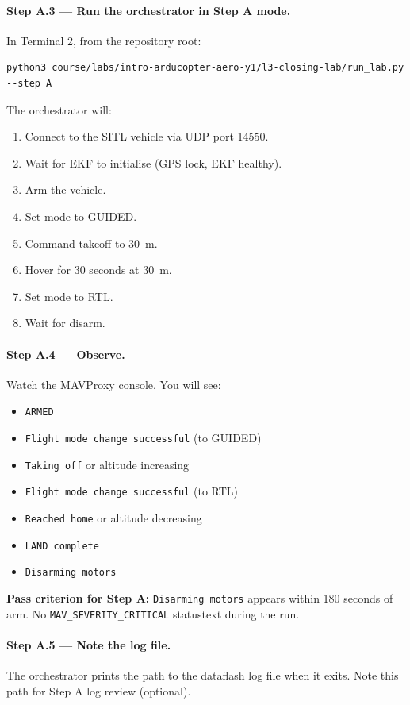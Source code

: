 \documentclass[a4paper,11pt,twoside]{article}
\begin{document}
\paragraph{Step A.3 --- Run the orchestrator in Step A mode.}
In Terminal 2, from the repository root:

\begin{Verbatim}[frame=single,fontsize=\small]
python3 course/labs/intro-arducopter-aero-y1/l3-closing-lab/run_lab.py --step A
\end{Verbatim}

The orchestrator will:
\begin{enumerate}
  \item Connect to the SITL vehicle via UDP port 14550.
  \item Wait for EKF to initialise (GPS lock, EKF healthy).
  \item Arm the vehicle.
  \item Set mode to GUIDED.
  \item Command takeoff to 30~m.
  \item Hover for 30 seconds at 30~m.
  \item Set mode to RTL.
  \item Wait for disarm.
\end{enumerate}

\paragraph{Step A.4 --- Observe.}
Watch the MAVProxy console. You will see:
\begin{itemize}
  \item \texttt{ARMED}
  \item \texttt{Flight mode change successful} (to GUIDED)
  \item \texttt{Taking off} or altitude increasing
  \item \texttt{Flight mode change successful} (to RTL)
  \item \texttt{Reached home} or altitude decreasing
  \item \texttt{LAND complete}
  \item \texttt{Disarming motors}
\end{itemize}

\textbf{Pass criterion for Step A:} \texttt{Disarming motors} appears within 180 seconds of arm. No \texttt{MAV\_SEVERITY\_CRITICAL} statustext during the run.

\paragraph{Step A.5 --- Note the log file.}
The orchestrator prints the path to the dataflash log file when it exits. Note this path for Step A log review (optional).
\end{document}
